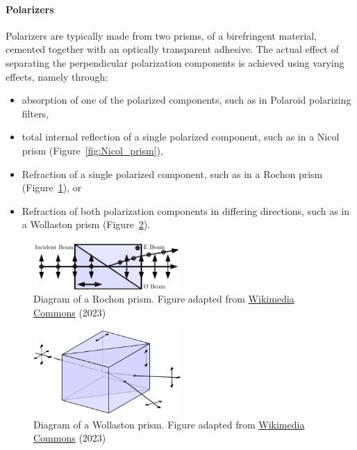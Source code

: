 \paragraph{Polarizers}
Polarizers are typically made from two prisms, of a birefringent material, cemented together with an optically transparent adhesive. The actual effect of separating the perpendicular polarization components is achieved using varying effects, namely through:
\begin{itemize}
  \item absorption of one of the polarized components, such as in Polaroid polarizing filters,
  \item total internal reflection of a single polarized component, such as in a Nicol prism (Figure~\ref{fig:Nicol_prism}),
  \item Refraction of a single polarized component, such as in a Rochon prism (Figure~\ref{fig:Rochon_prism}), or
  \item Refraction of both polarization components in differing directions, such as in a Wollaston prism (Figure~\ref{fig:Wollaston_prism}).
\end{itemize}

\begin{figure}[t]
  \centering
  \includegraphics[width=0.5\textwidth]{figures/2_rochon.pdf}
  \caption{Diagram of a Rochon prism. Figure adapted from \protect\href{https://commons.wikimedia.org/wiki/File:Rochon_Prism.svg}{Wikimedia Commons} (2023)}
  \label{fig:Rochon_prism}
\end{figure}

\begin{figure}[t]
  \centering
  \includegraphics[width=0.5\textwidth]{figures/2_wollaston.pdf}
  \caption{Diagram of a Wollaston prism. Figure adapted from \protect\href{https://commons.wikimedia.org/wiki/File:Wollaston-prism.svg}{Wikimedia Commons} (2023)}
  \label{fig:Wollaston_prism}
\end{figure}

